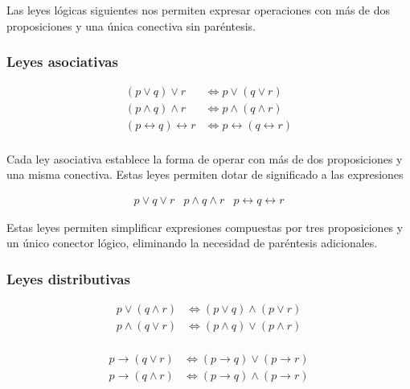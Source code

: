 Las leyes lógicas siguientes nos permiten expresar operaciones con más de
dos proposiciones y una única conectiva sin paréntesis.





\subsubsection{Leyes asociativas}

\begin{align*}
  (p \lor q) \lor r &\iff p \lor (q \lor r) \\
  (p \land q) \land r &\iff p \land (q \land r) \\
  (p \leftrightarrow q) \leftrightarrow r &\iff p \leftrightarrow (q
    \leftrightarrow r) \\
\end{align*}

Cada ley asociativa establece la forma de operar con más de dos
proposiciones y una misma conectiva. Estas leyes permiten dotar de
significado a las expresiones

$$
\begin{array}{ccc}
  p \lor q \lor r & p \land q \land r & p \leftrightarrow q \leftrightarrow r
\end{array}
$$

Estas leyes permiten simplificar expresiones compuestas por tres
proposiciones y un único conector lógico, eliminando la necesidad de
paréntesis adicionales.




\subsubsection{Leyes distributivas}

\begin{minipage}[t]{.45\textwidth}
  \centering
  \begin{align*}
    p \lor (q \land r) &\iff (p \lor q) \land (p \lor r) \\
    p \land (q \lor r) &\iff (p \land q) \lor (p \land r) \\
  \end{align*}
\end{minipage}
\begin{minipage}[t]{.45\textwidth}
  \centering
  \begin{align*}
    p \to (q \lor r) &\iff (p \to q) \lor (p \to r) \\
    p \to (q \land r) &\iff (p \to q) \land (p \to r) \\
  \end{align*}
\end{minipage}






